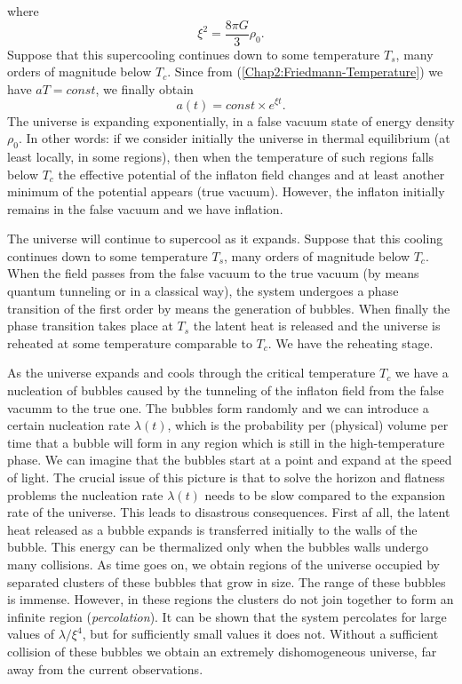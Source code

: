 \documentclass[11pt,a4paper,twoside]{book}
\begin{document}
where 
\begin{equation}
	\label{Chap2:psi}
	\xi^{2} =\frac{8\pi G}{3}\rho_{0}.
\end{equation}
Suppose that this supercooling continues down to some temperature $ T_{s} $, many orders of magnitude below $ T_{c} $.
Since from (\ref{Chap2:Friedmann-Temperature}) we have $ aT=const $, we finally obtain
\begin{equation}
	\label{Chap2:Expansion}
	a(t)=const \times e^{\xi t}.
\end{equation}
The universe is expanding exponentially, in a false vacuum state of energy density $\rho_{0}$. In other words: if we consider initially the universe in thermal equilibrium (at least locally, in some regions), then when the temperature of such regions falls below $ T_{c} $ the effective potential of the inflaton field changes and at least another minimum  of the potential appears (true vacuum). However, the inflaton initially remains in the false vacuum and we have inflation.
 
The universe will continue to supercool as it expands. Suppose that this cooling continues down to some temperature $ T_{s} $, many orders of magnitude below $ T_{c} $. When the field passes from the false vacuum to the true vacuum (by means quantum tunneling or in a classical way), the system undergoes a phase transition of the first order by means the generation of bubbles. When finally the phase transition takes place at $ T_{s} $ the latent heat is released and the universe is reheated at some temperature comparable to $ T_{c} $. We have the reheating stage.

As the universe expands and cools through the critical temperature $ T_{c} $ we have a nucleation of bubbles caused by the tunneling of the inflaton field from the false vacumm to the true one. The bubbles form randomly and we can introduce a certain nucleation rate $ \lambda(t) $, which is the probability per (physical) volume per time that a bubble will form in any region which is still in the high-temperature phase. We can imagine that the bubbles start at a point and expand at the speed of light. 
The crucial issue of this picture is that to solve the horizon and flatness problems the nucleation rate $ \lambda(t) $ needs to be slow compared to the expansion rate of the universe. This leads to disastrous consequences.
First af all, the latent heat released as a bubble expands is transferred initially to the walls of the bubble. This energy can be thermalized only when the bubbles walls undergo many collisions. As time goes on, we obtain regions of the universe occupied by separated clusters of these bubbles that grow in size. The range of these bubbles is immense. However, in these regions the clusters do not join together to form an infinite region (\textit{percolation}). It can be shown that the system percolates for large values of $ \lambda/\xi^{4} $, but for sufficiently small values it does not.
Without a sufficient collision of these bubbles we obtain an extremely dishomogeneous universe, far away from the current observations.
\end{document}
